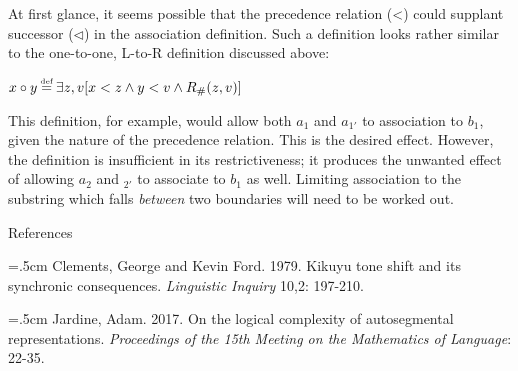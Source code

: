 \documentclass{article}
\newcommand\myeq{\mathrel{\stackrel{\makebox[0pt]{\mbox{\normalfont\tiny def}}}{=}}}
\begin{document}
\begin{center}
\end{center}
At first glance, it seems possible that the precedence relation (<) could supplant successor ($\triangleleft$) in the association definition. Such a definition looks rather similar to the one-to-one, L-to-R definition discussed above:
\begin{center}
$x \circ y \myeq  \exists z, v[x < z \wedge y < v \wedge R_{\#}(z, v)]$
\end{center}
This definition, for example, would allow both $a_1$ and $a_{1'}$ to association to $b_1$, given the nature of the precedence relation. This is the desired effect. However, the definition is insufficient in its restrictiveness; it produces the unwanted effect of allowing $a_2$ and $_{2'}$ to associate to $b_1$ as well. Limiting association to the substring which falls \textit{between} two boundaries will need to be worked out.
\pagebreak
\begin{center} References \end{center}
\smallskip{}
\hangindent=.5cm
Clements, George and Kevin Ford. 1979. Kikuyu tone shift and its synchronic consequences. \textit{Linguistic Inquiry} 10,2: 197-210.\\
\par \noindent
\hangindent=.5cm
Jardine, Adam. 2017. On the logical complexity of autosegmental representations. \textit{Proceedings of the 15th Meeting on the Mathematics of Language}: 22-35.\\
\end{document}
